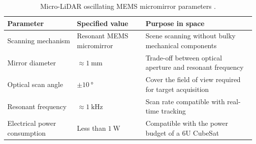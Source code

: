 \documentclass[11pt,a4paper]{article}
\newcommand{\todo}[1]{\textbf{[TO DO: #1]}}
\begin{document}
\begin{itemize}
    \begin{table}[H]
      \centering
      \small
      \caption{Micro-LiDAR oscillating MEMS micromirror parameters \cite{Liu2022}.}
      \label{tab:lidar_mems}
      \begin{tabular}{p{3.3cm} p{4.7cm} p{6.5cm}}
        \toprule
        \textbf{Parameter} & \textbf{Specified value} & \textbf{Purpose in space} \\
        \midrule
        Scanning mechanism & Resonant MEMS micromirror & Scene scanning without bulky mechanical components \\ %
        Mirror diameter & $\approx\SI{1}{\milli\metre}$ & Trade-off between optical aperture and resonant frequency \\ %
        Optical scan angle & $\pm\SI{10}{\degree}$ & Cover the field of view required for target acquisition \\ %
        Resonant frequency & $\approx\SI{1}{\kilo\hertz}$ & Scan rate compatible with real-time tracking \\ %
        Electrical power consumption & Less than $\SI{1}{\watt}$ & Compatible with the power budget of a 6U CubeSat \\ %
        \bottomrule
      \end{tabular}
    \end{table}
\end{itemize}



\end{document}
